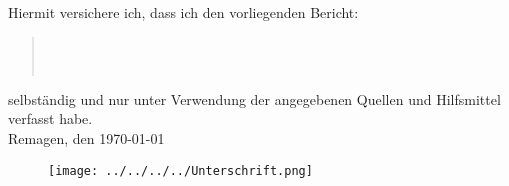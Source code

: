 Hiermit versichere ich, dass ich den vorliegenden Bericht:
\begin{quote}
\textit{\titel} \\ 
\textit{\untertitel} \\
\end{quote}
selbständig und nur unter Verwendung der angegebenen Quellen und Hilfsmittel verfasst habe.\\
Remagen, den \today
\begin{figure}[hp]
	\texttt{[image: ../../../../Unterschrift.png]}
\end{figure}

\textsc{\autor} 
